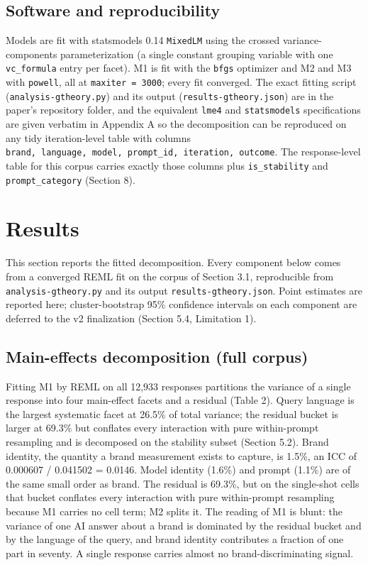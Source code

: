 \documentclass[pdflatex,sn-mathphys-num]{sn-jnl}
\begin{document}
\subsection{Software and reproducibility}\label{software-and-reproducibility}

Models are fit with statsmodels 0.14 \texttt{MixedLM} using the crossed variance-components parameterization (a single constant grouping variable with one \texttt{vc\_formula} entry per facet). M1 is fit with the \texttt{bfgs} optimizer and M2 and M3 with \texttt{powell}, all at \texttt{maxiter\ =\ 3000}; every fit converged. The exact fitting script (\texttt{analysis-gtheory.py}) and its output (\texttt{results-gtheory.json}) are in the paper's repository folder, and the equivalent \texttt{lme4} and \texttt{statsmodels} specifications are given verbatim in Appendix A so the decomposition can be reproduced on any tidy iteration-level table with columns \texttt{brand,\ language,\ model,\ prompt\_id,\ iteration,\ outcome}. The response-level table for this corpus carries exactly those columns plus \texttt{is\_stability} and \texttt{prompt\_category} (Section 8).

\section{Results}\label{results}

This section reports the fitted decomposition. Every component below comes from a converged REML fit on the corpus of Section 3.1, reproducible from \texttt{analysis-gtheory.py} and its output \texttt{results-gtheory.json}. Point estimates are reported here; cluster-bootstrap 95\% confidence intervals on each component are deferred to the v2 finalization (Section 5.4, Limitation 1).

\subsection{Main-effects decomposition (full corpus)}\label{main-effects-decomposition-full-corpus}

Fitting M1 by REML on all 12,933 responses partitions the variance of a single response into four main-effect facets and a residual (Table 2). Query language is the largest systematic facet at 26.5\% of total variance; the residual bucket is larger at 69.3\% but conflates every interaction with pure within-prompt resampling and is decomposed on the stability subset (Section 5.2). Brand identity, the quantity a brand measurement exists to capture, is 1.5\%, an ICC of 0.000607 / 0.041502 = 0.0146. Model identity (1.6\%) and prompt (1.1\%) are of the same small order as brand. The residual is 69.3\%, but on the single-shot cells that bucket conflates every interaction with pure within-prompt resampling because M1 carries no cell term; M2 splits it. The reading of M1 is blunt: the variance of one AI answer about a brand is dominated by the residual bucket and by the language of the query, and brand identity contributes a fraction of one part in seventy. A single response carries almost no brand-discriminating signal.
\end{document}
